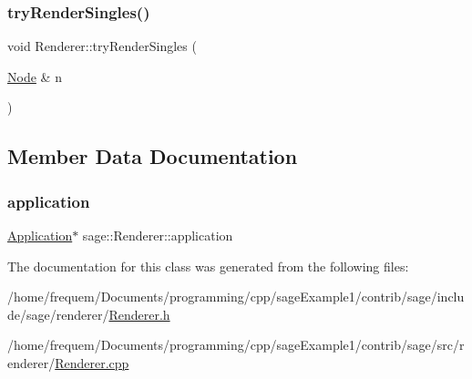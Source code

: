 \mbox{\label{classsage_1_1Renderer_a860500c3a330cee6471f384e5a8139c1}} 
\subsubsection{\texorpdfstring{tryRenderSingles()}{tryRenderSingles()}}
{\footnotesize\ttfamily void Renderer\+::try\+Render\+Singles (\begin{DoxyParamCaption}\item[{\mbox{\hyperlink{classsage_1_1Node}{Node}} \&}]{n }\end{DoxyParamCaption})\hspace{0.3cm}{\ttfamily [protected]}}



\subsection{Member Data Documentation}
\mbox{\label{classsage_1_1Renderer_a76559bf364299fb39ce7d9d084d56958}} 
\subsubsection{\texorpdfstring{application}{application}}
{\footnotesize\ttfamily \mbox{\hyperlink{classsage_1_1Application}{Application}}$\ast$ sage\+::\+Renderer\+::application\hspace{0.3cm}{\ttfamily [protected]}}



The documentation for this class was generated from the following files\+:\begin{DoxyCompactItemize}
\item 
/home/frequem/\+Documents/programming/cpp/sage\+Example1/contrib/sage/include/sage/renderer/\mbox{\hyperlink{Renderer_8h}{Renderer.\+h}}\item 
/home/frequem/\+Documents/programming/cpp/sage\+Example1/contrib/sage/src/renderer/\mbox{\hyperlink{Renderer_8cpp}{Renderer.\+cpp}}\end{DoxyCompactItemize}
